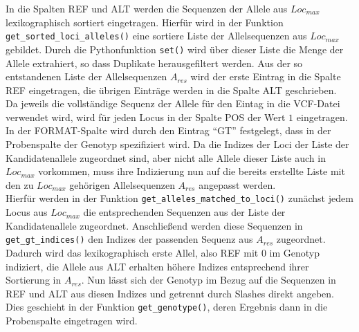 In die Spalten REF und ALT werden die Sequenzen der Allele aus $Loc_{max}$ lexikographisch sortiert eingetragen. Hierfür wird in der Funktion \lstinline|get_sorted_loci_alleles()| eine sortiere Liste der Allelsequenzen aus $Loc_{max}$ gebildet. Durch die Pythonfunktion \lstinline|set()| wird über dieser Liste die Menge der Allele extrahiert, so dass Duplikate herausgefiltert werden. Aus der so entstandenen Liste der Allelsequenzen $A_{res}$ wird der erste Eintrag in die Spalte REF eingetragen, die übrigen Einträge werden in die Spalte ALT geschrieben.\\

Da jeweils die vollständige Sequenz der Allele für den Eintag in die VCF-Datei verwendet wird, wird für jeden Locus in der Spalte POS der Wert $1$ eingetragen. \\

In der FORMAT-Spalte wird durch den Eintrag ``GT'' festgelegt, dass in der Probenspalte der Genotyp spezifiziert wird. Da die Indizes der Loci der Liste der Kandidatenallele zugeordnet sind, aber nicht alle Allele dieser Liste auch in $Loc_{max}$ vorkommen, muss ihre Indizierung nun auf die bereits erstellte Liste mit den zu $Loc_{max}$ gehörigen Allelsequenzen $A_{res}$ angepasst werden. \\

Hierfür werden in der Funktion \lstinline|get_alleles_matched_to_loci()| zunächst jedem Locus aus $Loc_{max}$ die entsprechenden Sequenzen aus der Liste der Kandidatenallele zugeordnet. Anschließend werden diese Sequenzen in \lstinline|get_gt_indices()| den Indizes der passenden Sequenz aus $A_{res}$ zugeordnet. Dadurch wird das lexikographisch erste Allel, also REF mit 0 im Genotyp indiziert, die Allele aus ALT erhalten höhere Indizes entsprechend ihrer Sortierung in $A_{res}$. Nun lässt sich der Genotyp im Bezug auf die Sequenzen in REF und ALT aus diesen Indizes und getrennt durch Slashes direkt angeben. Dies geschieht in der Funktion \lstinline|get_genotype()|, deren Ergebnis dann in die Probenspalte eingetragen wird.\\


